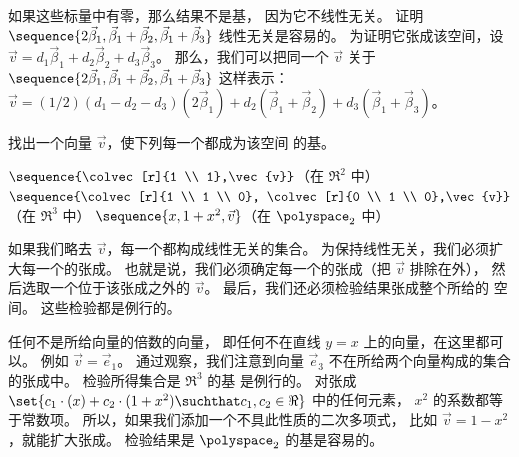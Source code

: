 \begin{exercises}
\begin{answer}
\begin{exparts}
           如果这些标量中有零，那么结果不是基，
           因为它不线性无关。
         \partsitem 证明
           $\sequence{2\vec{\beta}_1,\vec{\beta}_1+\vec{\beta}_2,
             \vec{\beta}_1+\vec{\beta}_3}$ 线性无关是容易的。
           为证明它张成该空间，设
           \( \vec{v}=d_1\vec{\beta}_1+d_2\vec{\beta}_2+d_3\vec{\beta}_3 \)。
           那么，我们可以把同一个 \( \vec{v} \) 关于
           \( \sequence{2\vec{\beta}_1,\vec{\beta}_1+\vec{\beta}_2,
                         \vec{\beta}_1+\vec{\beta}_3} \)
           这样表示：
           $\vec{v}=(1/2)(d_1-d_2-d_3)(2\vec{\beta}_1)
           +d_2(\vec{\beta}_1+\vec{\beta}_2)+d_3(\vec{\beta}_1+\vec{\beta}_3)$。
      \end{exparts}
    \end{answer}
  \item
    找出一个向量 $\vec{v}$，使下列每一个都成为该空间
    的基。
    \begin{exparts*}
      \partsitem $\sequence{\colvec[r]{1 \\ 1},\vec{v}}$（在 $\Re^2$ 中）
      \partsitem $\sequence{\colvec[r]{1 \\ 1 \\ 0},
                            \colvec[r]{0 \\ 1 \\ 0},\vec{v}}$（在 $\Re^3$ 中）
      \partsitem $\sequence{x,1+x^2,\vec{v}}$（在 $\polyspace_2$ 中）
    \end{exparts*}
    \begin{answer}
      如果我们略去 $\vec{v}$，每一个都构成线性无关的集合。
      为保持线性无关，我们必须扩大每一个的张成。
      也就是说，我们必须确定每一个的张成（把 $\vec{v}$ 排除在外），
      然后选取一个位于该张成之外的 $\vec{v}$。
      最后，我们还必须检验结果张成整个所给的
      空间。
      这些检验都是例行的。
      \begin{exparts}
        \partsitem 任何不是所给向量的倍数的向量，
          即任何不在直线 $y=x$ 上的向量，在这里都可以。
          例如 $\vec{v}=\vec{e}_1$。
        \partsitem 通过观察，我们注意到向量 $\vec{e}_3$
          不在所给两个向量构成的集合的张成中。
          检验所得集合是 $\Re^3$ 的基
          是例行的。
        \partsitem 对张成
          $\set{c_1\cdot(x)+c_2\cdot(1+x^2)\suchthat c_1,c_2\in\Re}$ 中的任何元素，
          $x^2$ 的系数都等于常数项。
          所以，如果我们添加一个不具此性质的二次多项式，
          比如 $\vec{v}=1-x^2$，就能扩大张成。
          检验结果是 $\polyspace_2$ 的基是容易的。
      \end{exparts}

\end{answer}
\end{exercises}
